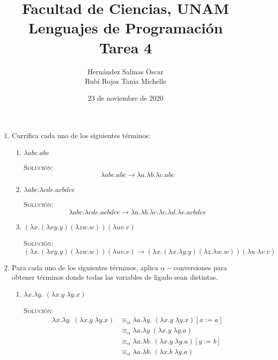 \documentclass[letterpaper,11pt]{article}
\title{Facultad de Ciencias, UNAM \\ 
       Lenguajes de Programación \\ 
       Tarea 4}
\author{Hernández Salinas Óscar \\ 
        Rubí Rojas Tania Michelle }
\date{23 de noviembre de 2020}
\begin{document}
\maketitle

\begin{enumerate}
    \item Currifica cada uno de los siguientes términos:
    \begin{enumerate}
        \item $\lambda abc.abc$

        \textsc{Solución:}
        \begin{equation*}
            \lambda abc.abc \rightarrow 
            \lambda a. \lambda b. \lambda c.abc
        \end{equation*}

        \item $\lambda abc. \lambda cde.acbdce$
        
        \textsc{Solución:}
        \begin{equation*}
            \lambda abc. \lambda cde.acbdce \rightarrow
            \lambda a. \lambda b. \lambda c. \lambda c. \lambda d. 
            \lambda e.acbdce
        \end{equation*}

        \item $(\lambda x.(\lambda xy.y) (\lambda zw.w)) (\lambda uv.v)$

        \textsc{Solución:}
        \begin{equation*}
            (\lambda x.(\lambda xy.y) (\lambda zw.w)) (\lambda uv.v) \rightarrow
            (\lambda x. (\lambda x. \lambda y. y) (\lambda z. \lambda w.w))
            (\lambda u. \lambda v.v)
        \end{equation*}
    \end{enumerate}

    \item Para cada uno de los siguientes términos, aplica $\alpha-$conversiones
    para obtener términos donde todas las variables de ligado sean distintas.
    \begin{enumerate}
        \item $\lambda x. \lambda y. \; (\lambda x.y \; \lambda y.x)$

        \textsc{Solución:}
        \begin{align*}
            \lambda x. \lambda y. \; (\lambda x.y \; \lambda y.x)
            &\equiv_{\alpha}
            \lambda a. \lambda y. \;(\lambda x.y \; \lambda y.x) [x := a] \\
            &\equiv_{\alpha} 
            \lambda a. \lambda y \; (\lambda x.y \; \lambda y.a) \\
            &\equiv_{\alpha}
            \lambda a. \lambda b. \; (\lambda x.y \; \lambda y.a) [y := b] \\
            &\equiv_{\alpha}
            \lambda a. \lambda b. \; (\lambda x.b \; \lambda y.a) 
        \end{align*}


\end{enumerate}
\end{enumerate}
\end{document}
